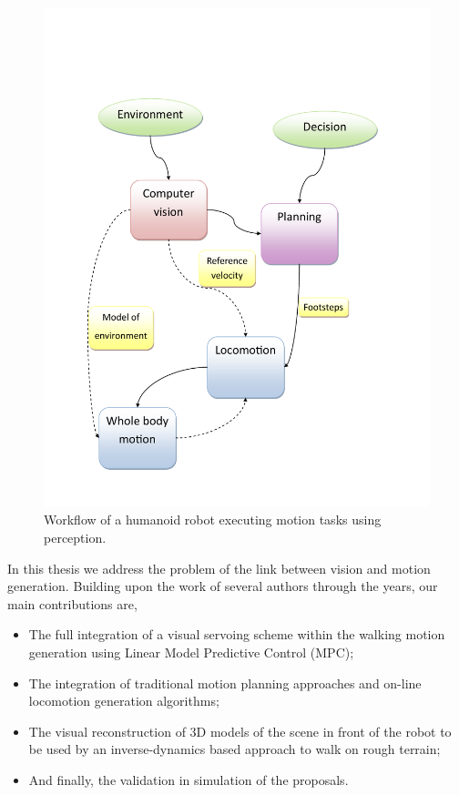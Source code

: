 \begin{figure}[h]
\centering
\includegraphics[scale=0.5]{Chap1-Introduction/general-diagram.pdf}
\caption[]{ \label{Fig:GeneralDiagram} Workflow of a humanoid robot executing motion tasks using perception.}
\end{figure}

In this thesis we address the problem of the link between vision and motion generation. Building upon the work of several authors through the years, our main contributions are,

\begin{itemize}
\item The full integration of a visual servoing scheme within the walking motion generation using Linear Model Predictive Control (MPC);
\item The integration of traditional motion planning approaches and on-line locomotion generation algorithms;
\item The visual reconstruction of 3D models of the scene in front of the robot to be used by an inverse-dynamics based approach to walk on rough terrain;
\item And finally, the validation in simulation of the proposals.
\end{itemize}

